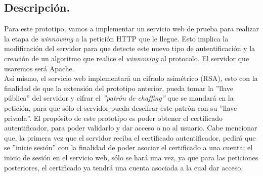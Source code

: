 \documentclass[12pt, a4paper, titlepage]{report}
\begin{document}
	        \subsection{Descripción.}
	            Para este prototipo, vamos a implementar un servicio web de prueba para realizar la etapa de \textit{winnowing} a la petición HTTP que le llegue. Esto implica la modificación del servidor para que detecte este nuevo tipo de autentificación y la creación de un algoritmo que realice el \textit{winnowing} al protocolo. El servidor que usaremos será Apache.\\
	            Así mismo, el servicio web implementará un cifrado asimétrico (RSA), esto con la finalidad de que la extensión del prototipo anterior, pueda tomar la ''llave pública'' del servidor y cifrar el \textit{''patrón de chaffing''} que se mandará en la petición, para que sólo el servidor pueda descifrar este patrón con su ''llave privada''.
	            El propósito de este prototipo es poder obtener el certificado autentificador, para poder validarlo y dar acceso o no al usuario. Cabe mencionar que, la primera vez que el servidor reciba el certificado autentificador, pedirá que se ''inicie sesión'' con la finalidad de poder asociar el certificado a una cuenta; el inicio de sesión en el servicio web, sólo se hará una vez, ya que para las peticiones posteriores, el certificado ya tendrá una cuenta asociada a la cual dar acceso.
	            
	        
	        
	    
\end{document}

